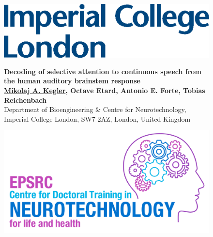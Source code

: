 \documentclass[a0,landscape]{a0poster}
\begin{document}

\begin{figure}[!htb]
  \begin{flushleft}
  \includegraphics[width=\textwidth,keepaspectratio]{ICL.eps}
  \end{flushleft}
\endminipage\hfill
{}
\centering
\veryHuge \color{Black} \textbf{Decoding of selective attention to continuous speech from the human auditory brainstem response} \color{Black}\\[1cm] %
\LARGE \textbf{\underline{Mikolaj A. Kegler}, Octave Etard, Antonio E. Forte, Tobias Reichenbach}\\[0.4cm] %
\Large  Department of Bioengineering \& Centre for Neurotechnology, Imperial College London, SW7 2AZ, London, United Kingdom%
\endminipage\hfill
{}%
  \begin{flushright}
  \includegraphics[width=\textwidth,keepaspectratio]{CDT.png}
  \end{flushright}
\endminipage
\end{figure}
%
\end{document}
